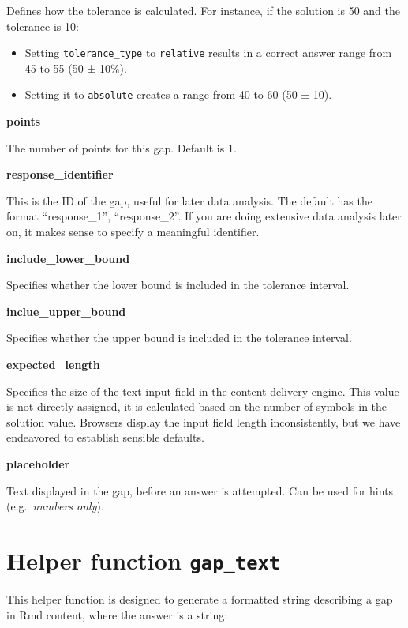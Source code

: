 \documentclass[twoside]{tufte-book}
\providecommand{\tightlist}{%
  \setlength{\itemsep}{0pt}\setlength{\parskip}{0pt}}
\begin{document}
Defines how the tolerance is calculated. For instance, if the solution is 50 and the tolerance is 10:

\begin{itemize}
\tightlist
\item
  Setting \texttt{tolerance\_type} to \texttt{relative} results in a correct answer range from 45 to 55 (50 ± 10\%).
\item
  Setting it to \texttt{absolute} creates a range from 40 to 60 (50 ± 10).
\end{itemize}

\noindent\textbf{points}\label{points-2}

The number of points for this gap. Default is 1.

\noindent\textbf{response\_identifier}\label{response_identifier}

This is the ID of the gap, useful for later data analysis. The default has the format ``response\_1'', ``response\_2''. If you are doing extensive data analysis later on, it makes sense to specify a meaningful identifier.

\noindent\textbf{include\_lower\_bound}\label{include_lower_bound}

Specifies whether the lower bound is included in the tolerance interval.

\noindent\textbf{inclue\_upper\_bound}\label{inclue_upper_bound}

Specifies whether the upper bound is included in the tolerance interval.

\noindent\textbf{expected\_length}\label{expected_length}

Specifies the size of the text input field in the content delivery engine. This value is not directly assigned, it is calculated based on the number of symbols in the solution value. Browsers display the input field length inconsistently, but we have endeavored to establish sensible defaults.

\noindent\textbf{placeholder}\label{placeholder}

Text displayed in the gap, before an answer is attempted. Can be used for hints (e.g.~\emph{numbers only}).

\section{\texorpdfstring{Helper function \texttt{gap\_text}}{Helper function gap\_text}}\label{gaptext}

This helper function is designed to generate a formatted string describing a gap in Rmd content, where the answer is a string:
\end{document}
